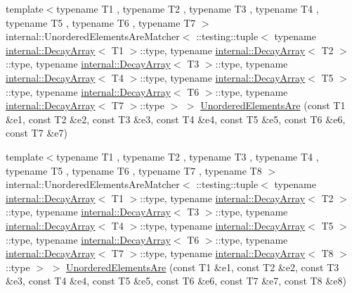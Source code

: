 \begin{DoxyCompactItemize}
{\footnotesize template$<$typename T1 , typename T2 , typename T3 , typename T4 , typename T5 , typename T6 , typename T7 $>$ }\\internal\+::\+Unordered\+Elements\+Are\+Matcher$<$ \+::testing\+::tuple$<$ typename \mbox{\hyperlink{structtesting_1_1internal_1_1DecayArray}{internal\+::\+Decay\+Array}}$<$ T1 $>$\+::type, typename \mbox{\hyperlink{structtesting_1_1internal_1_1DecayArray}{internal\+::\+Decay\+Array}}$<$ T2 $>$\+::type, typename \mbox{\hyperlink{structtesting_1_1internal_1_1DecayArray}{internal\+::\+Decay\+Array}}$<$ T3 $>$\+::type, typename \mbox{\hyperlink{structtesting_1_1internal_1_1DecayArray}{internal\+::\+Decay\+Array}}$<$ T4 $>$\+::type, typename \mbox{\hyperlink{structtesting_1_1internal_1_1DecayArray}{internal\+::\+Decay\+Array}}$<$ T5 $>$\+::type, typename \mbox{\hyperlink{structtesting_1_1internal_1_1DecayArray}{internal\+::\+Decay\+Array}}$<$ T6 $>$\+::type, typename \mbox{\hyperlink{structtesting_1_1internal_1_1DecayArray}{internal\+::\+Decay\+Array}}$<$ T7 $>$\+::type $>$ $>$ \mbox{\hyperlink{namespacetesting_add6e16fe24c45e39e92c0d19c04acf11}{Unordered\+Elements\+Are}} (const T1 \&e1, const T2 \&e2, const T3 \&e3, const T4 \&e4, const T5 \&e5, const T6 \&e6, const T7 \&e7)
\item 
{\footnotesize template$<$typename T1 , typename T2 , typename T3 , typename T4 , typename T5 , typename T6 , typename T7 , typename T8 $>$ }\\internal\+::\+Unordered\+Elements\+Are\+Matcher$<$ \+::testing\+::tuple$<$ typename \mbox{\hyperlink{structtesting_1_1internal_1_1DecayArray}{internal\+::\+Decay\+Array}}$<$ T1 $>$\+::type, typename \mbox{\hyperlink{structtesting_1_1internal_1_1DecayArray}{internal\+::\+Decay\+Array}}$<$ T2 $>$\+::type, typename \mbox{\hyperlink{structtesting_1_1internal_1_1DecayArray}{internal\+::\+Decay\+Array}}$<$ T3 $>$\+::type, typename \mbox{\hyperlink{structtesting_1_1internal_1_1DecayArray}{internal\+::\+Decay\+Array}}$<$ T4 $>$\+::type, typename \mbox{\hyperlink{structtesting_1_1internal_1_1DecayArray}{internal\+::\+Decay\+Array}}$<$ T5 $>$\+::type, typename \mbox{\hyperlink{structtesting_1_1internal_1_1DecayArray}{internal\+::\+Decay\+Array}}$<$ T6 $>$\+::type, typename \mbox{\hyperlink{structtesting_1_1internal_1_1DecayArray}{internal\+::\+Decay\+Array}}$<$ T7 $>$\+::type, typename \mbox{\hyperlink{structtesting_1_1internal_1_1DecayArray}{internal\+::\+Decay\+Array}}$<$ T8 $>$\+::type $>$ $>$ \mbox{\hyperlink{namespacetesting_a0f30358234947d21c7f39f15a8395d04}{Unordered\+Elements\+Are}} (const T1 \&e1, const T2 \&e2, const T3 \&e3, const T4 \&e4, const T5 \&e5, const T6 \&e6, const T7 \&e7, const T8 \&e8)

\end{DoxyCompactItemize}
